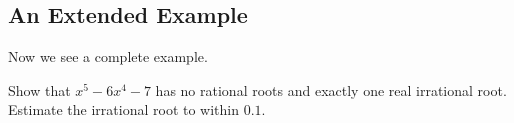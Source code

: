 \subsection{An Extended Example} 
Now we see a complete example.
\begin{Example}
Show that $x^5-6x^4-7$ has no rational roots and exactly one real irrational root. Estimate the irrational root to within $0.1$.
\fillpaper
\end{Example}